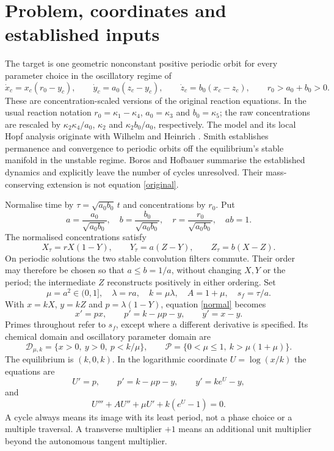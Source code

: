 \documentclass[11pt,a4paper]{article}
\theoremstyle{remark}\newtheorem{remark}[theorem]{Remark}
\begin{document}
\section{Problem, coordinates and established inputs}
The target is one geometric nonconstant positive periodic orbit for every parameter choice in the oscillatory regime of
\begin{equation}\label{original}
 \dot x_c=x_c(r_0-y_c),\qquad \dot y_c=a_0(z_c-y_c),\qquad \dot z_c=b_0(x_c-z_c),\qquad r_0>a_0+b_0>0.
\end{equation}
These are concentration-scaled versions of the original reaction equations. In the usual reaction notation $r_0=\kappa_1-\kappa_4$, $a_0=\kappa_3$ and $b_0=\kappa_5$; the raw concentrations are rescaled by $\kappa_2\kappa_4/a_0$, $\kappa_2$ and $\kappa_2b_0/a_0$, respectively. The model and its local Hopf analysis originate with Wilhelm and Heinrich \cite{WH95,WH96}. Smith \cite{Smith} establishes permanence and convergence to periodic orbits off the equilibrium's stable manifold in the unstable regime. Boros and Hofbauer \cite[Theorem 13 and the following paragraph]{BH} summarise the established dynamics and explicitly leave the number of cycles unresolved. Their mass-conserving extension is not equation \eqref{original}.

Normalise time by $\tau=\sqrt{a_0b_0}\,t$ and concentrations by $r_0$. Put
\[
 a=\frac{a_0}{\sqrt{a_0b_0}},\quad b=\frac{b_0}{\sqrt{a_0b_0}},\quad r=\frac{r_0}{\sqrt{a_0b_0}},\quad ab=1.
\]
The normalised concentrations satisfy
\begin{equation}\label{normal}
 X_\tau=rX(1-Y),\qquad Y_\tau=a(Z-Y),\qquad Z_\tau=b(X-Z).
\end{equation}
On periodic solutions the two stable convolution filters commute. Their order may therefore be chosen so that $a\le b=1/a$, without changing $X,Y$ or the period; the intermediate $Z$ reconstructs positively in either ordering. Set
\[
 \mu=a^2\in(0,1],\quad \lambda=ra,\quad k=\mu\lambda,\quad A=1+\mu,\quad s_f=\tau/a.
\]
With $x=kX$, $y=kZ$ and $p=\lambda(1-Y)$, equation \eqref{normal} becomes
\begin{equation}\label{fast}
 x'=px,\qquad p'=k-\mu p-y,\qquad y'=x-y.
\end{equation}
Primes throughout refer to $s_f$, except where a different derivative is specified. Its chemical domain and oscillatory parameter domain are
\[
 \mathcal D_{\mu,k}=\{x>0,\ y>0,\ p<k/\mu\},\qquad
 \mathcal P=\{0<\mu\le1,\ k>\mu(1+\mu)\}.
\]
The equilibrium is $(k,0,k)$. In the logarithmic coordinate $U=\log(x/k)$ the equations are
\begin{equation}\label{log}
 U'=p,\qquad p'=k-\mu p-y,\qquad y'=ke^U-y,
\end{equation}
and
\begin{equation}\label{scalar}
 U'''+AU''+\mu U'+k(e^U-1)=0.
\end{equation}
A cycle always means its image with its least period, not a phase choice or a multiple traversal. A transverse multiplier $+1$ means an additional unit multiplier beyond the autonomous tangent multiplier.
\end{document}
